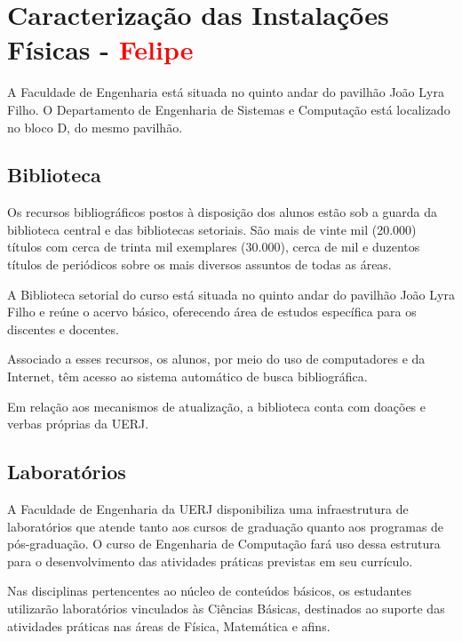 \chapter{Caracterização das Instalações Físicas - \textcolor{red}{Felipe}}

A Faculdade de Engenharia está situada no quinto andar do pavilhão João Lyra Filho. O Departamento de Engenharia de Sistemas e Computação está localizado no bloco D, do mesmo pavilhão.

\section{Biblioteca}
Os recursos bibliográficos postos à disposição dos alunos estão sob a guarda da biblioteca central e das bibliotecas setoriais. São mais de vinte mil (20.000) títulos com cerca de trinta mil exemplares (30.000), cerca de mil e duzentos títulos de periódicos sobre os mais diversos assuntos de todas as áreas.

A Biblioteca setorial do curso está situada no quinto andar do pavilhão João Lyra Filho e reúne o acervo básico, oferecendo área de estudos específica para os discentes e docentes.

Associado a esses recursos, os alunos, por meio do uso de computadores e da Internet, têm acesso ao sistema automático de busca bibliográfica.

Em relação aos mecanismos de atualização, a biblioteca conta com doações e verbas próprias da UERJ.

\section{Laboratórios}

A Faculdade de Engenharia da UERJ disponibiliza uma infraestrutura de laboratórios que atende tanto aos cursos de graduação quanto aos programas de pós-graduação. O curso de Engenharia de Computação fará uso dessa estrutura para o desenvolvimento das atividades práticas previstas em seu currículo.

Nas disciplinas pertencentes ao núcleo de conteúdos básicos, os estudantes utilizarão laboratórios vinculados às Ciências Básicas, destinados ao suporte das atividades práticas nas áreas de Física, Matemática e afins.

